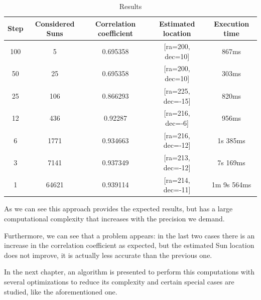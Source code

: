 \begin{table}[h!]
	\centering
	\def\arraystretch{1.2}
	\begin{tabular}{|c c c c c|} 
		\hline
		Step & Considered Suns & Correlation coefficient & Estimated location & Execution time \\ [0.5ex] 
		\hline\hline
		100 & 5 & 0.695358 & [ra=200, dec=10] & 867ms \\
		\hline 
		50 & 25 & 0.695358 & [ra=200, dec=10] & 303ms \\
			\hline 
		25 & 106 & 0.866293 & [ra=225, dec=-15] & 820ms \\
			\hline 
		12 & 436 & 0.92287 & [ra=216, dec=-6] & 956ms \\
			\hline 
		6 & 1771 & 0.934663 & [ra=216, dec=-12] & 1s 385ms \\
			\hline 
		3 & 7141 & 0.937349 & [ra=213, dec=-12] & 7s 169ms \\
			\hline 
		1 & 64621 & 0.939114 & [ra=214, dec=-11] & 1m 9s 564ms \\
		\hline 
		\hline 
	\end{tabular}
	\caption{Results}
\end{table}

As we can see this approach provides the expected results, but has a large computational complexity that increases with the precision we demand. 

Furthermore, we can see that a problem appears: in the last two cases there is an increase in the correlation coefficient as expected, but the estimated Sun location does not improve, it is actually less accurate than the previous one.

In the next chapter, an algorithm is presented to perform this computations with several optimizations to reduce its complexity and certain special cases are studied, like the aforementioned one.
